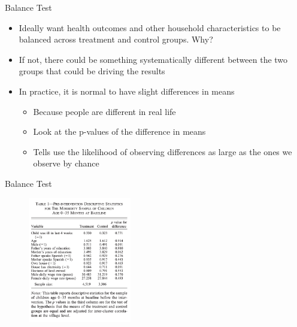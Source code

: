 \documentclass[11pt,notes=hide,aspectratio=169,mathserif]{beamer}
\begin{document}
\begin{frame}{Balance Test}
\begin{itemize}
\item Ideally want health outcomes and other household characteristics to be balanced across treatment and control groups. Why?
\item If not, there could be something systematically different between the two groups that could be driving the results 
\item In practice, it is normal to have slight differences in means 
\begin{itemize}
    \item Because people are different in real life 
    \item Look at the p-values of the difference in means 
    \item Tells use the likelihood of observing differences as large as the ones we observe by chance 
\end{itemize}
\end{itemize}
\end{frame}

\begin{frame}{Balance Test}
\begin{figure}
\centering
\includegraphics[width=0.4\textwidth]{inputs/table1.png}
\end{figure}
\end{frame}
\end{document}
